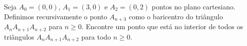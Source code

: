 Seja $A_0 = (0, 0)$, $A_1 = (3, 0)$ e $A_2 = (0, 2)$ pontos no plano cartesiano.
Definimos recursivamente o ponto $A_{n+3}$ como o baricentro do triângulo $A_n A_{n+1} A_{n+2}$ para $n \ge 0$.
Encontre um ponto que está no interior de todos os triângulos $A_n A_{n+1} A_{n+2}$ para todo $n \ge 0$.
